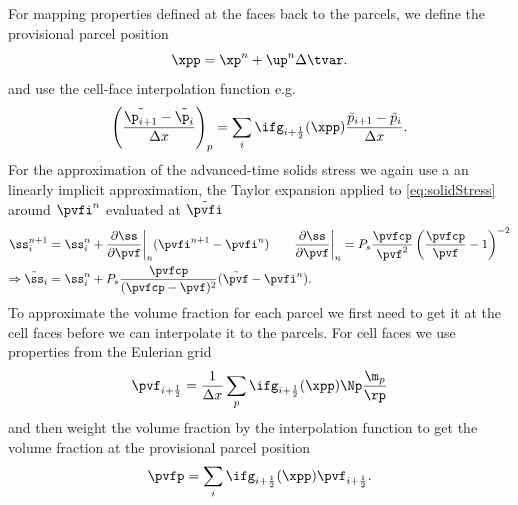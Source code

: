 For mapping properties defined at the faces back to the parcels, we define the provisional parcel position
\begin{equation}
    \label{eq:provPartPos}
    \xpp = \xp^n + \up^n \Delta \tvar.
\end{equation}
and use the cell-face interpolation function e.g.
\begin{equation}
    \label{eq:cellFaceInterpolation}
    \left( \dfrac{\tilde{\p_{i+1}} - \tilde{\p_{i}}}{\Delta x} \right)_p = \sum_i \ifg_{i+ \frac{1}{2}} (\xpp ) \frac{\tilde{p}_{i+1} - \tilde{p}_i}{\Delta x}.
\end{equation}
For the approximation of the advanced-time solids stress we again use a an linearly implicit approximation, the Taylor expansion applied to \eqref{eq:solidStress} around $\pvfi^n$ evaluated at $\tilde{\pvfi}$
\begin{align}
    \ss_i^{n+1} &= \ss_i^n + \dfrac{\partial \ss}{\partial \pvf}\bigg|_n  (\pvfi^{n+1} - \pvfi^n)  \qquad \dfrac{\partial \ss}{\partial \pvf}\bigg|_n = P_s \dfrac{\pvfcp}{\pvf^2} \left( \dfrac{\pvfcp}{\pvf} -1 \right)^{-2}\\
    \Rightarrow \tilde{\ss}_i &= \ss_i^n + P_s\dfrac{\pvfcp}{(\pvfcp - \pvf)^2} (\tilde{\pvf}- \pvfi^n).
\end{align}
To approximate the volume fraction for each parcel we first need to get it at the cell faces before we can interpolate it to the parcels. 
For cell faces we use properties from the Eulerian grid
\begin{equation}
    \label{eq:interpolationPVFCellFace}
    \pvf_{i+ \frac{1}{2}} = \dfrac{1}{\Delta x} \sum_p \ifg_{i+\frac{1}{2}} (\xpp ) \Np \dfrac{\m_p}{\rp}
\end{equation}
and then weight the volume fraction by the interpolation function to get the volume fraction at the provisional parcel position
\begin{equation}
    \label{eq:interpolatePPP}
    \pvfp = \sum_i \ifg_{i+\frac{1}{2}} (\xpp) \pvf_{i+\frac{1}{2}}.
\end{equation}

